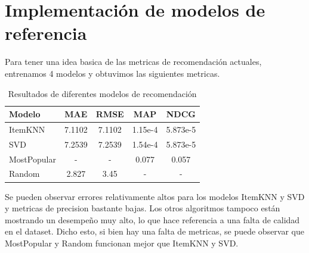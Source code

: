 \documentclass[11pt]{article}
\begin{document}
\section{Implementación de modelos de referencia} 
Para tener una idea basica de las metricas de recomendación actuales, entrenamos 4 modelos y obtuvimos las siguientes metricas.
\begin{table}[h!]
\centering
\begin{tabular}{|l|c|c|c|c|}
\hline
\textbf{Modelo}    & \textbf{MAE}   & \textbf{RMSE}  & \textbf{MAP}     & \textbf{NDCG}        \\ \hline
ItemKNN            & 7.1102         & 7.1102         & 1.15e-4          & 5.873e-5             \\ \hline
SVD                & 7.2539         & 7.2539         & 1.54e-4          & 5.873e-5             \\ \hline
MostPopular        & -              & -              & 0.077            & 0.057                \\ \hline
Random             & 2.827          & 3.45           & -                & -                    \\ \hline
\end{tabular}
\caption{Resultados de diferentes modelos de recomendación}
\end{table}
\newline
Se pueden observar errores relativamente altos para los modelos ItemKNN y SVD y metricas de precision bastante bajas. Los otros algoritmos tampoco están mostrando un desempeño muy alto, lo que hace referencia a una falta de calidad en el dataset. Dicho esto, si bien hay una falta de metricas, se puede observar que MostPopular y Random funcionan mejor que ItemKNN y SVD.
\end{document}
